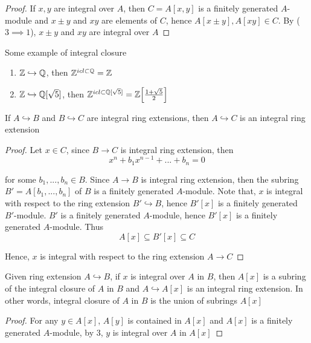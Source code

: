 \begin{proof}
	If $x, y$ are integral over $A$, then $C = A[x, y]$ is a finitely generated $A$-module and $x \pm y$ and $xy$ are elements of $C$, hence $A[x \pm y], A[xy] \in C$. By ($3 \implies 1$), $x \pm y$ and $xy$ are integral over $A$
\end{proof}

\begin{remark}
	Some example of integral closure
	\begin{enumerate}
		\item $\mathbb{Z} \hookrightarrow \mathbb{Q}$, then $\mathbb{Z}^{icl \subset \mathbb{Q}} = \mathbb{Z}$
		\item $\mathbb{Z} \hookrightarrow \mathbb{Q}[\sqrt{5}]$, then $\Z^{icl \subset \Q[\sqrt{5}]} = \Z\bracket*{\frac{1 + \sqrt{5}}{2}}$
	\end{enumerate}
\end{remark}

\begin{proposition}
	If $A \hookrightarrow B$ and $B \hookrightarrow C$ are integral ring extensions, then $A \hookrightarrow C$ is an integral ring extension
\end{proposition}

\begin{proof}
	Let $x \in C$, since $B \to C$ is integral ring extension, then
	$$
		x^n + b_1 x^{n-1} + ... + b_n = 0
	$$
	
	for some $b_1, ..., b_n \in B$. Since $A \to B$ is integral ring extension, then the subring $B' = A[b_1, ..., b_n]$ of $B$ is a finitely generated $A$-module. Note that, $x$ is integral with respect to the ring extension $B' \hookrightarrow B$, hence $B'[x]$ is a finitely generated $B'$-module. $B'$ is a finitely generated $A$-module, hence $B'[x]$ is a finitely generated $A$-module. Thus
	$$
		A[x] \subseteq B'[x] \subseteq C
	$$
	
	Hence, $x$ is integral with respect to the ring extension $A \to C$
\end{proof}

\begin{remark}
	Given ring extension $A \hookrightarrow B$, if $x$ is integral over $A$ in $B$, then $A[x]$ is a subring of the integral closure of $A$ in $B$ and $A \hookrightarrow A[x]$ is an integral ring extension. In other words, integral closure of $A$ in $B$ is the union of subrings $A[x]$
\end{remark}

\begin{proof}
	For any $y \in A[x]$, $A[y]$ is contained in $A[x]$ and $A[x]$ is a finitely generated $A$-module, by $3$, $y$ is integral over $A$ in $A[x]$
\end{proof}

